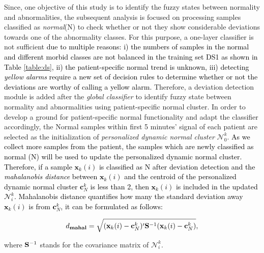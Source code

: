 Since, one objective of this study is to identify the fuzzy states between normality and abnormalities, the subsequent analysis is focused on processing samples classified as \textit{normal}(N) 
to check whether or not they show considerable deviations towards one of the abnormality classes. For this purpose, a one-layer classifier is not sufficient \textcolor{black}{due to multiple reasons: i) the numbers of samples in the normal and different morbid classes are not balanced in the training set DS1 as shown in Table \ref{table:ds}, ii) the patient-specific normal trend is unknown, iii) detecting \textit{yellow alarms} require a new set of decision rules to determine whether or not the deviations are worthy of calling a yellow alarm.} Therefore, a deviation detection module is added after the \textit{global classifier} to identify fuzzy state between normality and abnormalities %
using patient-specific normal cluster. In order to develop a ground for patient-specific normal functionality and adapt the classifier accordingly, the Normal samples within first 5 minutes' signal of each patient are selected as the initialization of \textit{personalized dynamic normal cluster} $\mathcal{N}_0^k$. \textcolor{black}{As we collect more samples from the patient, the samples which are newly classified as normal (N) will be used to update the personalized dynamic normal cluster. Therefore, if a sample $\mathbf{x}_k(i)$ is classified as N after deviation detection and the \textit{mahalanobis distance} between $\mathbf{x}_k(i)$ and the centroid of the personalized dynamic normal cluster $\mathbf{c}^k_N$ is less than 2, then $\mathbf{x}_k(i)$ is included in the updated $\mathcal{N}_i^k$. Mahalanobis distance quantifies how many the standard deviation away $\mathbf{x}_k(i)$ is from $\mathbf{c}^k_N$, it can be formulated as follows:}

\begin{align}
d_{\mathbf{mahal}} = \sqrt{ (\mathbf{x}_k(i)- \mathbf{c}^k_N)' {\rm \bf S}^{-1} (\mathbf{x}_k(i) - \mathbf{c}^k_N) },
\end{align}

where ${\rm \bf S}^{-1}$ stands for the covariance matrix of $\mathcal{N}_i^k$.


